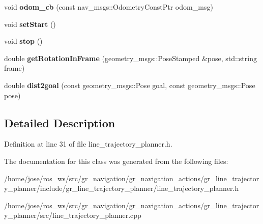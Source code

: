 \begin{DoxyCompactItemize}
void {\bfseries odom\+\_\+cb} (const nav\+\_\+msgs\+::\+Odometry\+Const\+Ptr odom\+\_\+msg)
\item 
\mbox{\label{classgr__line__trajectory__planner_1_1GRLinePlanner_ab6d45c340d3fbef152526965b7df1694}} 
void {\bfseries set\+Start} ()
\item 
\mbox{\label{classgr__line__trajectory__planner_1_1GRLinePlanner_a327e4fac6dc19a81b9bb1b89e5523e0f}} 
void {\bfseries stop} ()
\item 
\mbox{\label{classgr__line__trajectory__planner_1_1GRLinePlanner_a681775de390df9533712b2eb5dff2a48}} 
double {\bfseries get\+Rotation\+In\+Frame} (geometry\+\_\+msgs\+::\+Pose\+Stamped \&pose, std\+::string frame)
\item 
\mbox{\label{classgr__line__trajectory__planner_1_1GRLinePlanner_aee6532aefe21ef5cf6bc64d5a8b40f0b}} 
double {\bfseries dist2goal} (const geometry\+\_\+msgs\+::\+Pose goal, const geometry\+\_\+msgs\+::\+Pose pose)
\end{DoxyCompactItemize}


\subsection{Detailed Description}


Definition at line 31 of file line\+\_\+trajectory\+\_\+planner.\+h.



The documentation for this class was generated from the following files\+:\begin{DoxyCompactItemize}
\item 
/home/jose/ros\+\_\+ws/src/gr\+\_\+navigation/gr\+\_\+navigation\+\_\+actions/gr\+\_\+line\+\_\+trajectory\+\_\+planner/include/gr\+\_\+line\+\_\+trajectory\+\_\+planner/line\+\_\+trajectory\+\_\+planner.\+h\item 
/home/jose/ros\+\_\+ws/src/gr\+\_\+navigation/gr\+\_\+navigation\+\_\+actions/gr\+\_\+line\+\_\+trajectory\+\_\+planner/src/line\+\_\+trajectory\+\_\+planner.\+cpp\end{DoxyCompactItemize}

